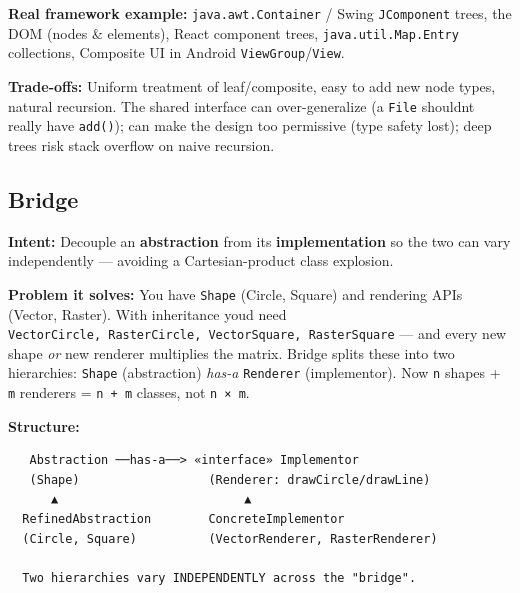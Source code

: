 \documentclass[11pt]{article}
\begin{document}
\textbf{Real framework example:} \texttt{java.awt.Container} / Swing \texttt{JComponent} trees, the DOM (nodes \& elements), React component trees, \texttt{java.util.Map.Entry} collections, Composite UI in Android \texttt{ViewGroup}/\texttt{View}.

\textbf{Trade-offs:} Uniform treatment of leaf/composite, easy to add new node types, natural recursion. The shared interface can over-generalize (a \texttt{File} shouldn\textquotesingle t really have \texttt{add()}); can make the design too permissive (type safety lost); deep trees risk stack overflow on naive recursion.

\subsection{Bridge}\label{bridge}

\textbf{Intent:} Decouple an \textbf{abstraction} from its \textbf{implementation} so the two can vary independently --- avoiding a Cartesian-product class explosion.

\textbf{Problem it solves:} You have \texttt{Shape} (Circle, Square) and rendering APIs (Vector, Raster). With inheritance you\textquotesingle d need \texttt{VectorCircle,\ RasterCircle,\ VectorSquare,\ RasterSquare} --- and every new shape \emph{or} new renderer multiplies the matrix. Bridge splits these into two hierarchies: \texttt{Shape} (abstraction) \emph{has-a} \texttt{Renderer} (implementor). Now \texttt{n} shapes + \texttt{m} renderers = \texttt{n\ +\ m} classes, not \texttt{n\ ×\ m}.

\textbf{Structure:}

\setcodelang{}

\begin{verbatim}
   Abstraction ──has-a──> «interface» Implementor
   (Shape)                  (Renderer: drawCircle/drawLine)
      ▲                          ▲
  RefinedAbstraction        ConcreteImplementor
  (Circle, Square)          (VectorRenderer, RasterRenderer)

  Two hierarchies vary INDEPENDENTLY across the "bridge".
\end{verbatim}

\end{document}
